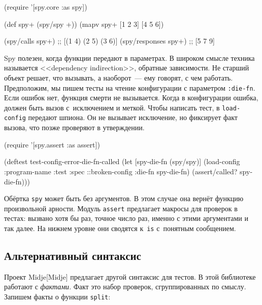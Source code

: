 \begin{english}
  \begin{clojure}
(require '[spy.core :as spy])

(def spy+ (spy/spy +))
(mapv spy+ [1 2 3] [4 5 6])

(spy/calls spy+)
;; [(1 4) (2 5) (3 6)]
(spy/responses spy+)
;; [5 7 9]
  \end{clojure}
\end{english}



Spy полезен, когда функции передают в параметрах. В широком смысле техника
называется <<dependency indirection>>, обратные зависимости. Не старший объект
решает, что вызывать, а наоборот~--- ему говорят, с чем работать. Предположим,
мы пишем тесты на чтение конфигурации с параметром \verb|:die-fn|. Если ошибок
нет, функция смерти не вызывается. Когда в конфигурации ошибка, должен быть
вызов с~исключением и меткой. Чтобы написать тест, в \verb|load-config| передают
шпиона. Он не вызывает исключение, но фиксирует факт вызова, что позже проверяют
в утверждении.

\begin{english}
  \begin{clojure}
(require '[spy.assert :as assert])

(deftest test-config-error-die-fn-called
  (let [spy-die-fn (spy/spy)]
    (load-config {:program-name :test
                  :spec ::broken-config
                  :die-fn spy-die-fn})
    (assert/called? spy-die-fn)))
  \end{clojure}
\end{english}

Обёртка \verb|spy| может быть без аргументов. В этом случае она вернёт
функцию произвольной арности. Модуль \verb|assert| предлагает макросы для
проверок в тестах: вызвано хотя бы раз, точное число раз, именно с этими
аргументами и так далее. На нижнем уровне они сводятся к~\verb|is| с~понятным
сообщением.

\subsection{Альтернативный синтаксис}


Проект Midje[Midje] предлагает другой
синтаксис для тестов. В этой библиотеке работают с \emph{фактами}. Факт это
набор проверок, сгруппированных по смыслу. Запишем факты о функции
\verb|split|:

